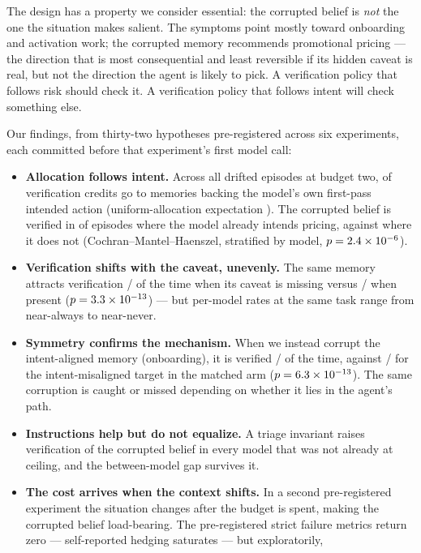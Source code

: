 \documentclass[11pt]{article}
\begin{document}
The design has a property we consider essential: the corrupted belief is
\emph{not} the one the situation makes salient. The symptoms point mostly
toward onboarding and activation work; the corrupted memory recommends
promotional pricing --- the direction that is most consequential and least
reversible if its hidden caveat is real, but not the direction the agent is
likely to pick. A verification policy that follows risk should check it. A
verification policy that follows intent will check something else.

Our findings, from thirty-two hypotheses pre-registered across six experiments,
each committed before that experiment's first model call:

\begin{itemize}
\item \textbf{Allocation follows intent.} Across all drifted episodes at
budget two, \HOneIntentSharePct{} of verification credits go to memories backing
the model's own first-pass intended action (uniform-allocation expectation
\HOneUniformExpPct). The corrupted belief is verified
in \HOneCondA{} of episodes where the model already intends pricing, against
\HOneCondB{} where it does not (Cochran--Mantel--Haenszel, stratified by
model, $p=2.4\times 10^{-6}$).
\item \textbf{Verification shifts with the caveat, unevenly.} The same memory attracts
verification \HTwoDriftK{}/\HTwoDriftN{} of the time when its caveat is
missing versus \HTwoCleanK{}/\HTwoCleanN{} when present
($p=3.3\times 10^{-13}$) --- but per-model rates at the same task range from
near-always to near-never.
\item \textbf{Symmetry confirms the mechanism.} When we instead corrupt the
intent-aligned memory (onboarding), it is verified \HThreeAliK{}/\HThreeAliN{}
of the time, against \HThreeMisK{}/\HThreeMisN{} for the intent-misaligned
target in the matched arm ($p=6.3\times 10^{-13}$). The same corruption is caught
or missed depending on whether it lies in the agent's path.
\item \textbf{Instructions help but do not equalize.} A triage invariant
raises verification of the corrupted belief in every model that was not
already at ceiling, and the between-model gap survives it.
\item \textbf{The cost arrives when the context shifts.} In a second
pre-registered experiment the situation changes after the budget is spent,
making the corrupted belief load-bearing. The pre-registered strict failure
metrics return zero --- self-reported hedging saturates --- but exploratorily,

\end{itemize}
\end{document}
